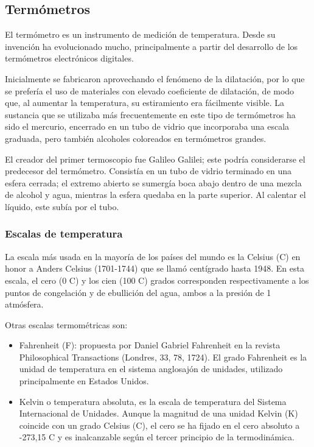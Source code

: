 			\subsection{Termómetros}
				\par 
					El termómetro es un instrumento de medición de temperatura. Desde su invención ha evolucionado mucho, principalmente a partir del desarrollo de los termómetros electrónicos digitales.
				\par \noindent
					Inicialmente se fabricaron aprovechando el fenómeno de la dilatación, por lo que se prefería el uso de materiales con elevado coeficiente de dilatación, de modo que, al aumentar la temperatura, su estiramiento era fácilmente visible. La sustancia que se utilizaba más frecuentemente en este tipo de termómetros ha sido el mercurio, encerrado en un tubo de vidrio que incorporaba una escala graduada, pero también alcoholes coloreados en termómetros grandes.
				\par \noindent
					El creador del primer termoscopio fue Galileo Galilei; este podría considerarse el predecesor del termómetro. Consistía en un tubo de vidrio terminado en una esfera cerrada; el extremo abierto se sumergía boca abajo dentro de una mezcla de alcohol y agua, mientras la esfera quedaba en la parte superior. Al calentar el líquido, este subía por el tubo.
					
				\subsubsection{Escalas de temperatura}
					\par 
						La escala más usada en la mayoría de los países del mundo es la Celsius (\textdegree{}C) en honor a Anders Celsius (1701-1744) que se llamó centígrado hasta 1948. En esta escala, el cero (0 \textdegree{}C) y los cien (100 \textdegree{}C) grados corresponden respectivamente a los puntos de congelación y de ebullición del agua, ambos a la presión de 1 atmósfera.
					
					\newpage
					\thispagestyle{plain}
					
					\par 
						Otras escalas termométricas son:
						
						\begin{itemize}
							\item Fahrenheit (\textdegree{}F):  propuesta por Daniel Gabriel Fahrenheit en la revista Philosophical Transactions (Londres, 33, 78, 1724). El grado Fahrenheit es la unidad de temperatura en el sistema anglosajón de unidades, utilizado principalmente en Estados Unidos.
							
							\item Kelvin o temperatura absoluta, es la escala de temperatura del Sistema Internacional de Unidades. Aunque la magnitud de una unidad Kelvin (K) coincide con un grado Celsius (\textdegree{}C), el cero se ha fijado en el cero absoluto a -273,15 \textdegree{}C y es inalcanzable según el tercer principio de la termodinámica.
						\end{itemize}
